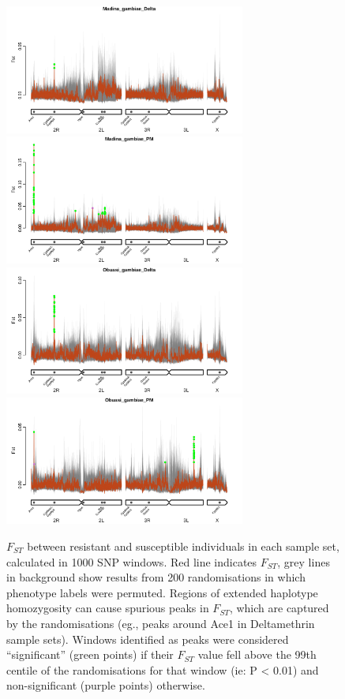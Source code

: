\documentclass[a4paper,12pt]{article}
\begin{document}
\begin{figure}[h]
	\vskip 0.4cm
	\includegraphics*[width = 7.9cm]{../../randomisations/Fst/Madina_gambiae_Delta_peak_filter_plot.png}
	\includegraphics*[width = 7.9cm]{../../randomisations/Fst/Madina_gambiae_PM_peak_filter_plot.png}
	\vskip 0.4cm
	\includegraphics*[width = 7.9cm]{../../randomisations/Fst/Obuasi_gambiae_Delta_peak_filter_plot.png}
	\includegraphics*[width = 7.9cm]{../../randomisations/Fst/Obuasi_gambiae_PM_peak_filter_plot.png}
	\caption{\footnotesize $F_{ST}$ between resistant and susceptible individuals in each sample set, calculated in 1000 SNP windows. Red line indicates $F_{ST}$, grey lines in background show results from 200 randomisations in which phenotype labels were permuted. Regions of extended haplotype homozygosity can cause spurious peaks in $F_{ST}$, which are captured by the randomisations (eg., peaks around Ace1 in Deltamethrin sample sets). Windows identified as peaks were considered ``significant'' (green points) if their $F_{ST}$ value fell above the 99th centile of the randomisations for that window (ie: P < 0.01) and non-significant (purple points) otherwise.}
	\label{FigS5}
\end{figure}
\end{document}
